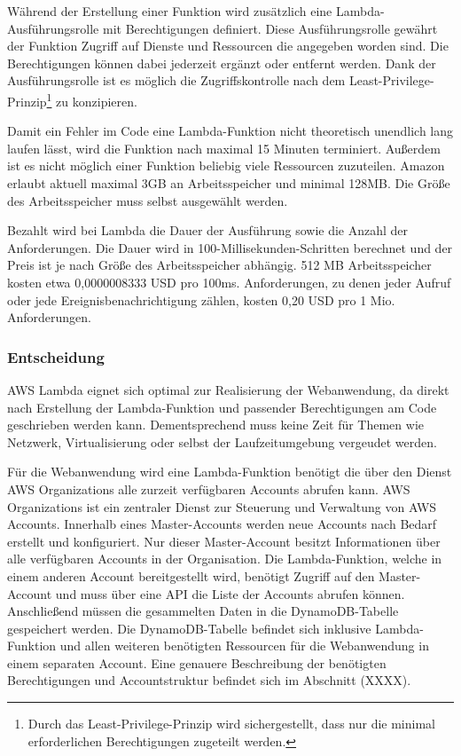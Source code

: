 {Während der Erstellung einer Funktion wird zusätzlich eine Lambda-Ausführungsrolle mit Berechtigungen definiert.
Diese Ausführungsrolle gewährt der Funktion Zugriff auf Dienste und Ressourcen die angegeben worden sind.
Die Berechtigungen können dabei jederzeit ergänzt oder entfernt werden.
Dank der Ausführungsrolle ist es möglich die Zugriffskontrolle nach dem Least-Privilege-Prinzip\footnote{Durch das Least-Privilege-Prinzip wird sichergestellt, dass nur die minimal erforderlichen Berechtigungen zugeteilt werden. } zu konzipieren.


Damit ein Fehler im Code eine Lambda-Funktion nicht theoretisch unendlich lang laufen lässt, wird die Funktion nach maximal 15 Minuten terminiert.
Außerdem ist es nicht möglich einer Funktion beliebig viele Ressourcen zuzuteilen.
Amazon erlaubt aktuell maximal 3GB an Arbeitsspeicher und minimal 128MB.
Die Größe des Arbeitsspeicher muss selbst ausgewählt werden.

Bezahlt wird bei Lambda die Dauer der Ausführung sowie die Anzahl der Anforderungen.
Die Dauer wird in 100-Millisekunden-Schritten berechnet und der Preis ist je nach Größe des Arbeitsspeicher abhängig.
512 MB Arbeitsspeicher kosten etwa 0,0000008333 USD pro 100ms.
Anforderungen, zu denen jeder Aufruf oder jede Ereignisbenachrichtigung zählen, kosten 0,20 USD pro 1 Mio. Anforderungen.\cite[]{LambdaPreise}

\subsubsection{Entscheidung}
AWS Lambda eignet sich optimal zur Realisierung der Webanwendung, da direkt nach Erstellung der Lambda-Funktion und passender Berechtigungen am Code geschrieben werden kann.
Dementsprechend muss keine Zeit für Themen wie Netzwerk, Virtualisierung oder selbst der Laufzeitumgebung vergeudet werden.

Für die Webanwendung wird eine Lambda-Funktion benötigt die über den Dienst AWS Organizations alle zurzeit verfügbaren Accounts abrufen kann.
AWS Organizations ist ein zentraler Dienst zur Steuerung und Verwaltung von AWS Accounts.
Innerhalb eines Master-Accounts werden neue Accounts nach Bedarf erstellt und konfiguriert.
Nur dieser Master-Account besitzt Informationen über alle verfügbaren Accounts in der Organisation.
Die Lambda-Funktion, welche in einem anderen Account bereitgestellt wird, benötigt Zugriff auf den Master-Account und muss über eine API die Liste der Accounts abrufen können.
Anschließend müssen die gesammelten Daten in die DynamoDB-Tabelle gespeichert werden.
Die DynamoDB-Tabelle befindet sich inklusive Lambda-Funktion und allen weiteren benötigten Ressourcen für die Webanwendung in einem separaten Account.
Eine genauere Beschreibung der benötigten Berechtigungen und Accountstruktur befindet sich im Abschnitt (XXXX).

}
